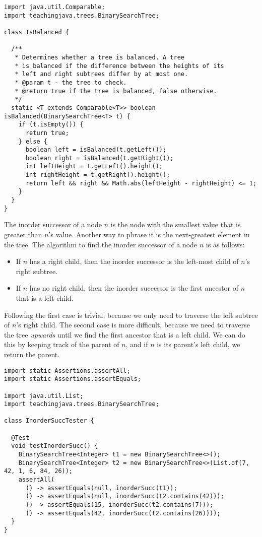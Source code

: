 \begin{lstlisting}[language=MyJava]
import java.util.Comparable;
import teachingjava.trees.BinarySearchTree;

class IsBalanced {

  /**
   * Determines whether a tree is balanced. A tree 
   * is balanced if the difference between the heights of its 
   * left and right subtrees differ by at most one.
   * @param t - the tree to check.
   * @return true if the tree is balanced, false otherwise.
   */
  static <T extends Comparable<T>> boolean isBalanced(BinarySearchTree<T> t) {
    if (t.isEmpty()) {
      return true;
    } else {
      boolean left = isBalanced(t.getLeft());
      boolean right = isBalanced(t.getRight());
      int leftHeight = t.getLeft().height();
      int rightHeight = t.getRight().height();
      return left && right && Math.abs(leftHeight - rightHeight) <= 1;
    }
  }
}
\end{lstlisting}

The inorder successor of a node $n$ is the node with the smallest value that is greater than $n$'s value. 
Another way to phrase it is the next-greatest element in the tree.
The algorithm to find the inorder successor of a node $n$ is as follows:
\begin{itemize}
  \item If $n$ has a right child, then the inorder successor is the left-most child of $n$'s right subtree.
  \item If $n$ has no right child, then the inorder successor is the first ancestor of $n$ that is a left child.
\end{itemize}
Following the first case is trivial, because we only need to traverse the left subtree of $n$'s right child. 
The second case is more difficult, because we need to traverse the tree \emph{upwards} until we find the first ancestor that is a left child. 
We can do this by keeping track of the parent of $n$, and if $n$ is its parent's left child, we return the parent.

\begin{lstlisting}[language=MyJava]
import static Assertions.assertAll;
import static Assertions.assertEquals;

import java.util.List;
import teachingjava.trees.BinarySearchTree;

class InorderSuccTester {

  @Test
  void testInorderSucc() {
    BinarySearchTree<Integer> t1 = new BinarySearchTree<>();
    BinarySearchTree<Integer> t2 = new BinarySearchTree<>(List.of(7, 42, 1, 6, 84, 26));
    assertAll(
      () -> assertEquals(null, inorderSucc(t1));
      () -> assertEquals(null, inorderSucc(t2.contains(42)));
      () -> assertEquals(15, inorderSucc(t2.contains(7)));
      () -> assertEquals(42, inorderSucc(t2.contains(26))));
  }
}
\end{lstlisting}


